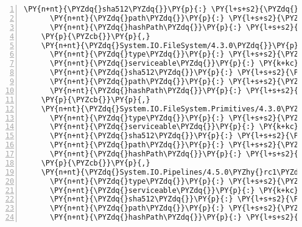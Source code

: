 \begin{Verbatim}[commandchars=\\\{\},numbers=left,firstnumber=1,stepnumber=1,numberblanklines=0]
      \PY{n+nt}{\PYZdq{}sha512\PYZdq{}}\PY{p}{:} \PY{l+s+s2}{\PYZdq{}sha512\PYZhy{}YHndyoiV90iu4iKG115ibkhrG+S3jBm8Ap9OwoUAzO5oPDAWcr0SFwQFm0HjM8WkEZWo0zvLTyLmbvTkW1bXgg==\PYZdq{}}\PY{p}{,}
      \PY{n+nt}{\PYZdq{}path\PYZdq{}}\PY{p}{:} \PY{l+s+s2}{\PYZdq{}system.io.compression/4.3.0\PYZdq{}}\PY{p}{,}
      \PY{n+nt}{\PYZdq{}hashPath\PYZdq{}}\PY{p}{:} \PY{l+s+s2}{\PYZdq{}system.io.compression.4.3.0.nupkg.sha512\PYZdq{}}
    \PY{p}{\PYZcb{}}\PY{p}{,}
    \PY{n+nt}{\PYZdq{}System.IO.FileSystem/4.3.0\PYZdq{}}\PY{p}{:} \PY{p}{\PYZob{}}
      \PY{n+nt}{\PYZdq{}type\PYZdq{}}\PY{p}{:} \PY{l+s+s2}{\PYZdq{}package\PYZdq{}}\PY{p}{,}
      \PY{n+nt}{\PYZdq{}serviceable\PYZdq{}}\PY{p}{:} \PY{k+kc}{true}\PY{p}{,}
      \PY{n+nt}{\PYZdq{}sha512\PYZdq{}}\PY{p}{:} \PY{l+s+s2}{\PYZdq{}sha512\PYZhy{}3wEMARTnuio+ulnvi+hkRNROYwa1kylvYahhcLk4HSoVdl+xxTFVeVlYOfLwrDPImGls0mDqbMhrza8qnWPTdA==\PYZdq{}}\PY{p}{,}
      \PY{n+nt}{\PYZdq{}path\PYZdq{}}\PY{p}{:} \PY{l+s+s2}{\PYZdq{}system.io.filesystem/4.3.0\PYZdq{}}\PY{p}{,}
      \PY{n+nt}{\PYZdq{}hashPath\PYZdq{}}\PY{p}{:} \PY{l+s+s2}{\PYZdq{}system.io.filesystem.4.3.0.nupkg.sha512\PYZdq{}}
    \PY{p}{\PYZcb{}}\PY{p}{,}
    \PY{n+nt}{\PYZdq{}System.IO.FileSystem.Primitives/4.3.0\PYZdq{}}\PY{p}{:} \PY{p}{\PYZob{}}
      \PY{n+nt}{\PYZdq{}type\PYZdq{}}\PY{p}{:} \PY{l+s+s2}{\PYZdq{}package\PYZdq{}}\PY{p}{,}
      \PY{n+nt}{\PYZdq{}serviceable\PYZdq{}}\PY{p}{:} \PY{k+kc}{true}\PY{p}{,}
      \PY{n+nt}{\PYZdq{}sha512\PYZdq{}}\PY{p}{:} \PY{l+s+s2}{\PYZdq{}sha512\PYZhy{}6QOb2XFLch7bEc4lIcJH49nJN2HV+OC3fHDgsLVsBVBk3Y4hFAnOBGzJ2lUu7CyDDFo9IBWkSsnbkT6IBwwiMw==\PYZdq{}}\PY{p}{,}
      \PY{n+nt}{\PYZdq{}path\PYZdq{}}\PY{p}{:} \PY{l+s+s2}{\PYZdq{}system.io.filesystem.primitives/4.3.0\PYZdq{}}\PY{p}{,}
      \PY{n+nt}{\PYZdq{}hashPath\PYZdq{}}\PY{p}{:} \PY{l+s+s2}{\PYZdq{}system.io.filesystem.primitives.4.3.0.nupkg.sha512\PYZdq{}}
    \PY{p}{\PYZcb{}}\PY{p}{,}
    \PY{n+nt}{\PYZdq{}System.IO.Pipelines/4.5.0\PYZhy{}rc1\PYZdq{}}\PY{p}{:} \PY{p}{\PYZob{}}
      \PY{n+nt}{\PYZdq{}type\PYZdq{}}\PY{p}{:} \PY{l+s+s2}{\PYZdq{}package\PYZdq{}}\PY{p}{,}
      \PY{n+nt}{\PYZdq{}serviceable\PYZdq{}}\PY{p}{:} \PY{k+kc}{true}\PY{p}{,}
      \PY{n+nt}{\PYZdq{}sha512\PYZdq{}}\PY{p}{:} \PY{l+s+s2}{\PYZdq{}sha512\PYZhy{}QXBpiD6f8QFSzPnfejN1Sf5cH5LA0j3aieQwNs6hRu6BWXWZLIjELL+Nf0B7na6wwJoSBU4+9aR3kU9qBVsR9A==\PYZdq{}}\PY{p}{,}
      \PY{n+nt}{\PYZdq{}path\PYZdq{}}\PY{p}{:} \PY{l+s+s2}{\PYZdq{}system.io.pipelines/4.5.0\PYZhy{}rc1\PYZdq{}}\PY{p}{,}
      \PY{n+nt}{\PYZdq{}hashPath\PYZdq{}}\PY{p}{:} \PY{l+s+s2}{\PYZdq{}system.io.pipelines.4.5.0\PYZhy{}rc1.nupkg.sha512\PYZdq{}}

\end{Verbatim}
